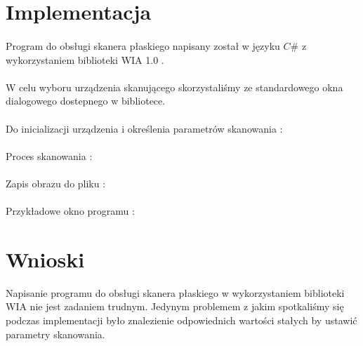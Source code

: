 \documentclass[wide,a4paper,titlepage,12pt] {article}
\begin{document}
\section{Implementacja}
\paragraph{} %
\label{par:}
Program do obsługi skanera płaskiego napisany został w języku $C\#$ z wykorzystaniem biblioteki WIA 1.0 .

\paragraph{} %
\label{}
W celu wyboru urządzenia skanującego skorzystaliśmy ze standardowego okna dialogowego dostepnego w bibliotece.


\paragraph{}
Do inicializacji urządzenia i określenia parametrów skanowania : 

\paragraph{} %
\label{par:}
Proces skanowania :

\paragraph{} %
\label{par:}
Zapis obrazu do pliku :

\paragraph{} %
\label{par:}
Przykładowe okno programu :


\section{Wnioski}
Napisanie programu do obsługi skanera płaskiego w wykorzystaniem biblioteki WIA nie jest zadaniem trudnym. Jedynym problemem z jakim spotkaliśmy się podczas implementacji było znalezienie odpowiednich wartości stałych by ustawić parametry skanowania.
\paragraph{}
\end{document}
